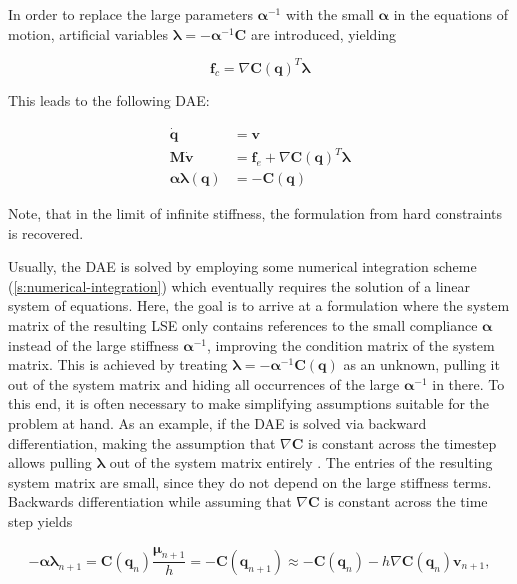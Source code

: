 \noindent In order to replace the large parameters $\bm{\alpha}^{-1}$ with the small 
$\bm{\alpha}$ in the equations of motion, artificial variables $\bm{\lambda} = -\bm{\alpha}^{-1}\bm{C}$ are introduced, yielding 

\begin{equation}\label{eq:compliant-force-lambda}
    \bm{f}_c = \nabla \bm{C}(\bm{q})^T\bm{\lambda}
\end{equation}

\noindent This leads to the following DAE:

\begin{equation}\label{eq:compliant-dae}
\begin{split}
    \bm{\dot{q}} &= \bm{v} \\
    \bm{M\dot{v}} &= \bm{f}_{e} + \nabla \bm{C}(\bm{q})^T\bm{\lambda} \\
    \bm{\alpha}\bm{\lambda}(\bm{q}) &= -\bm{C}(\bm{q})
\end{split}
\end{equation}

\noindent Note, that in the limit of infinite stiffness, the formulation from hard constraints is recovered. 

Usually, the DAE is solved by employing some
numerical integration scheme (\cref{s:numerical-integration}) which eventually requires the solution of a linear system of equations. Here, 
the goal is to arrive at a formulation where the system matrix of the resulting LSE only contains references to the small compliance 
$\bm{\alpha}$ 
instead of the large stiffness $\bm{\alpha}^{-1}$, improving the condition matrix of the system matrix. This is achieved by treating 
$\bm{\lambda} = -\bm{\alpha}^{-1}\bm{C}(\bm{q})$ as an unknown, pulling it out of the system matrix and hiding
all occurrences of the large $\bm{\alpha}^{-1}$ in there. To this end, it is often necessary to make simplifying assumptions suitable for the problem
at hand. As an example, if the DAE is solved via backward differentiation, making the assumption that $\nabla \bm{C}$ is constant across 
the timestep allows pulling $\bm{\lambda}$ out of the system matrix entirely \cite{tournier2015}. The entries of the resulting system matrix 
are small, since they do not depend on the large stiffness terms. Backwards differentiation while assuming that $\nabla \bm{C}$ is 
constant across the time step yields

\[
    -\bm{\alpha\lambda}_{n+1} = \bm{C}(\bm{q}_n)\frac{\bm{\mu}_{n+1}}{h} = -\bm{C}(\bm{q}_{n+1}) \approx -\bm{C}(\bm{q}_n) - h\nabla 
    \bm{C}(\bm{q}_n) \bm{v}_{n+1},
\]

